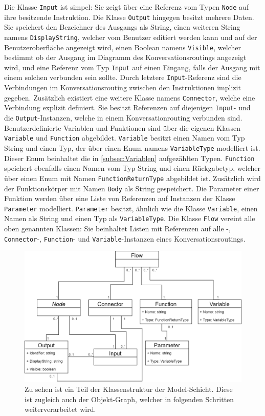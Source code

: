Die Klasse \texttt{Input} ist simpel: Sie zeigt über eine Referenz vom Typen \texttt{Node} auf ihre besitzende Instruktion. Die Klasse \texttt{Output} hingegen besitzt mehrere Daten. Sie speichert den Bezeichner des Ausgangs als String, einen weiteren String namens \texttt{DisplayString}, welcher vom Benutzer editiert werden kann und auf der Benutzeroberfläche angezeigt wird, einen Boolean namens \texttt{Visible}, welcher bestimmt ob der Ausgang im Diagramm des Konversationsroutings angezeigt wird, und eine Referenz vom Typ \texttt{Input} auf einen Eingang, falls der Ausgang mit einem solchen verbunden sein sollte. Durch letztere \texttt{Input}-Referenz sind die Verbindungen im Konversationsrouting zwischen den Instruktionen implizit gegeben. Zusätzlich existiert eine weitere Klasse namens \texttt{Connector}, welche eine Verbindung explizit definiert. Sie besitzt Referenzen auf diejenigen \texttt{Input}- und die \texttt{Output}-Instanzen, welche in einem Konversationrouting verbunden sind.
\newline
Benutzerdefinierte Variablen und Funktionen sind über die eigenen Klassen \texttt{Va\-ri\-a\-ble} und \texttt{Function} abgebildet. \texttt{Variable} besitzt einen Namen vom Typ String und einen Typ, der über einen Enum namens \texttt{VariableType} modelliert ist. Dieser Enum beinhaltet die in \ref{subsec:Variablen} aufgezählten Typen. \texttt{Function} speichert ebenfalls einen Namen vom Typ String und einen Rückgabetyp, welcher über einen Enum mit Namen \texttt{FunctionReturnType} abgebildet ist. Zusätzlich wird der Funktionskörper mit Namen \texttt{Body} als String gespeichert. Die Parameter einer Funktion werden über eine Liste von Referenzen auf Instanzen der Klasse \texttt{Parameter} modelliert. \texttt{Parameter} besitzt, ähnlich wie die Klasse \texttt{Variable}, einen Namen als String und einen Typ als \texttt{VariableType}. Die Klasse \texttt{Flow} vereint alle oben genannten Klassen: Sie beinhaltet Listen mit Referenzen auf alle -, \texttt{Connector}-, \texttt{Function}- und \texttt{Variable}-Instanzen eines Konversationsroutings. 

\begin{figure} %
	\centering
		\includegraphics[width=\textwidth]{img/FlowClassStructure.png}
	\caption[Klassenstruktur der Model-Schicht]{Zu sehen ist ein Teil der Klassenstruktur der Model-Schicht. Diese ist zugleich auch der Objekt-Graph, welcher in folgenden Schritten weiterverarbeitet wird.}
	\label{fig:UML:Model-Schicht}
\end{figure}

